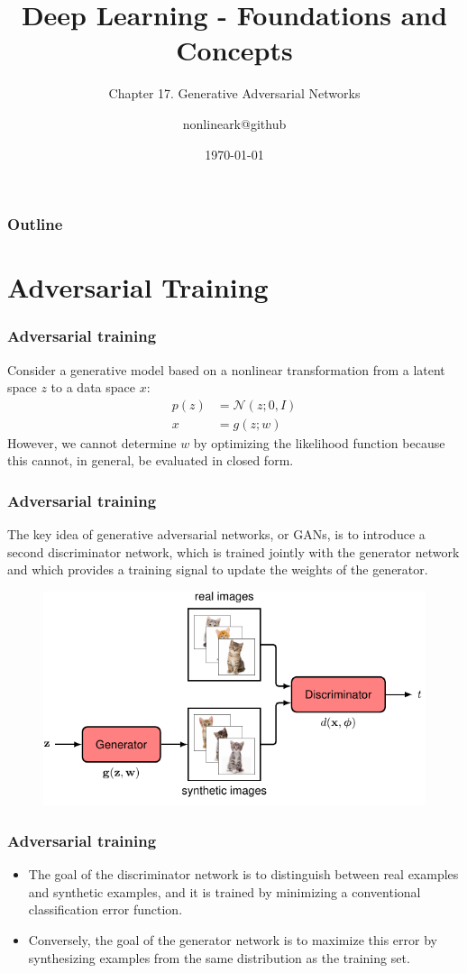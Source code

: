 \documentclass{beamer}
\title{Deep Learning - Foundations and Concepts}
\subtitle{Chapter 17. Generative Adversarial Networks}
\author{nonlineark@github}
\date{\today}
\begin{document}
\begin{frame}
    \titlepage
\end{frame}

\begin{frame}
    \frametitle{Outline}
    \tableofcontents
\end{frame}

\section{Adversarial Training}

\begin{frame}
    \frametitle{Adversarial training}
    Consider a generative model based on a nonlinear transformation from a latent space $z$ to a data space $x$:
    \begin{align*}
        p(z)&=\mathcal{N}(z;0,I) \\
        x&=g(z;w)
    \end{align*}
    However, we cannot determine $w$ by optimizing the likelihood function because this cannot, in general, be evaluated in closed form.
\end{frame}

\begin{frame}
    \frametitle{Adversarial training}
    The key idea of generative adversarial networks, or GANs, is to introduce a second discriminator network, which is trained jointly with the generator network and which provides a training signal to update the weights of the generator.
    \begin{figure}
        \includegraphics[height=0.5\textheight]{Figure_1.pdf}
    \end{figure}
\end{frame}

\begin{frame}
    \frametitle{Adversarial training}
    \begin{itemize}
        \item The goal of the discriminator network is to distinguish between real examples and synthetic examples, and it is trained by minimizing a conventional classification error function.
        \item Conversely, the goal of the generator network is to maximize this error by synthesizing examples from the same distribution as the training set.
    \end{itemize}
\end{frame}
\end{document}
